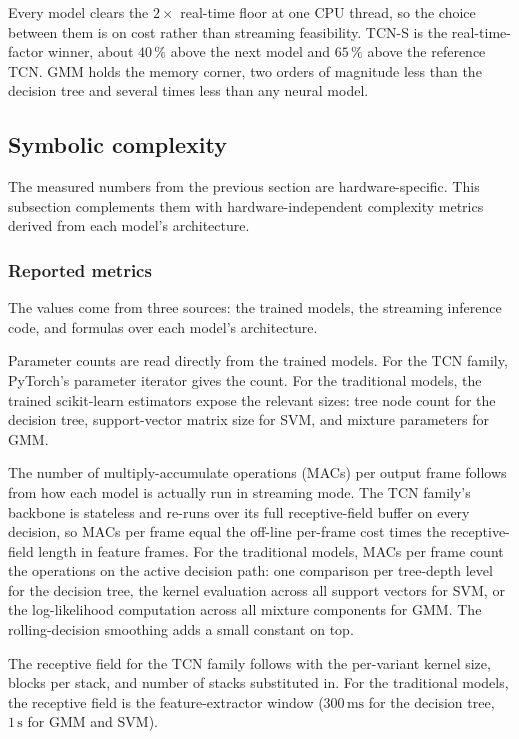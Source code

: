 \break

Every model clears the $2\times$ real-time floor at one CPU thread, so the choice between them is on cost rather than streaming feasibility.
TCN-S is the real-time-factor winner, about $40\,\%$ above the next model and $65\,\%$ above the reference TCN.
GMM holds the memory corner, two orders of magnitude less than the decision tree and several times less than any neural model.

\subsection{Symbolic complexity}
\label{subsec:exp_complexity_symbolic_results}

The measured numbers from the previous section are hardware-specific.
This subsection complements them with hardware-independent complexity metrics derived from each model's architecture.

\subsubsection{Reported metrics}

The values come from three sources: the trained models, the streaming inference code, and formulas over each model's architecture.

Parameter counts are read directly from the trained models.
For the TCN family, PyTorch's parameter iterator gives the count.
For the traditional models, the trained scikit-learn estimators expose the relevant sizes: tree node count for the decision tree, support-vector matrix size for SVM, and mixture parameters for GMM.

The number of multiply-accumulate operations (MACs) per output frame follows from how each model is actually run in streaming mode.
The TCN family's backbone is stateless and re-runs over its full receptive-field buffer on every decision, so MACs per frame equal the off-line per-frame cost times the receptive-field length in feature frames.
For the traditional models, MACs per frame count the operations on the active decision path: one comparison per tree-depth level for the decision tree, the kernel evaluation across all support vectors for SVM, or the log-likelihood computation across all mixture components for GMM.
The rolling-decision smoothing adds a small constant on top.

The receptive field for the TCN family follows  with the per-variant kernel size, blocks per stack, and number of stacks substituted in.
For the traditional models, the receptive field is the feature-extractor window ($300\,\text{ms}$ for the decision tree, $1\,\text{s}$ for GMM and SVM).

